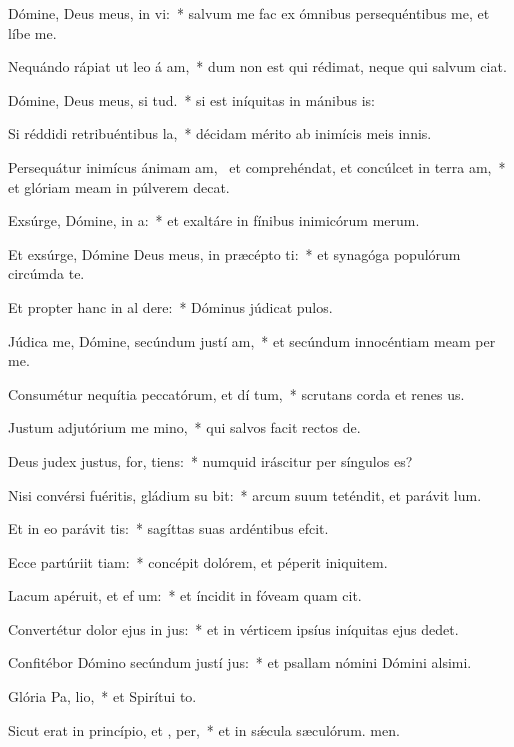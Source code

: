 \item Dómine, Deus meus, in  vi:~* salvum me fac ex ómnibus persequéntibus me, et líbe me.
\item Nequándo rápiat ut leo á am,~* dum non est qui rédimat, neque qui salvum ciat.
\item Dómine, Deus meus, si  tud.~* si est iníquitas in mánibus is:
\item Si réddidi retribuéntibus  la,~* décidam mérito ab inimícis meis innis.
\item Persequátur inimícus ánimam am,~\pscross{} et comprehéndat, et concúlcet in terra  am,~* et glóriam meam in púlverem decat.
\item Exsúrge, Dómine, in  a:~* et exaltáre in fínibus inimicórum merum.
\item Et exsúrge, Dómine Deus meus, in præcépto  ti:~* et synagóga populórum circúmda te.
\item Et propter hanc in al dere:~* Dóminus júdicat pulos.
\item Júdica me, Dómine, secúndum justí am,~* et secúndum innocéntiam meam per me.
\item Consumétur nequítia peccatórum, et dí tum,~* scrutans corda et renes us.
\item Justum adjutórium me  mino,~* qui salvos facit rectos de.
\item Deus judex justus, for,  tiens:~* numquid iráscitur per síngulos es?
\item Nisi convérsi fuéritis, gládium su bit:~* arcum suum teténdit, et parávit lum.
\item Et in eo parávit  tis:~* sagíttas suas ardéntibus efcit.
\item Ecce partúriit tiam:~* concépit dolórem, et péperit iniquitem.
\item Lacum apéruit, et ef um:~* et íncidit in fóveam quam cit.
\item Convertétur dolor ejus in  jus:~* et in vérticem ipsíus iníquitas ejus dedet.
\item Confitébor Dómino secúndum justí jus:~* et psallam nómini Dómini alsimi.
\item Glória Pa,  lio,~* et Spirítui to.
\item Sicut erat in princípio, et ,  per,~* et in sǽcula sæculórum. men.
